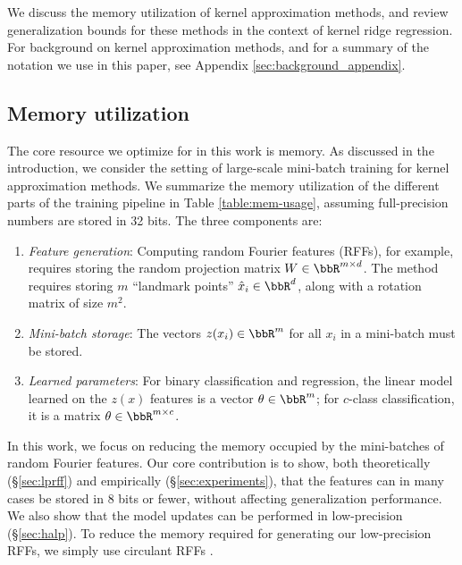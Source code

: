 We discuss the memory utilization of kernel approximation methods, and review generalization bounds for these methods in the context of kernel ridge regression. For background on kernel approximation methods, and for a summary of the notation we use in this paper, see Appendix \ref{sec:background_appendix}.
\vsp
\subsection{Memory utilization}
\label{subsec:memory_utils}
The core resource we optimize for in this work is memory.  As discussed in the introduction, we consider the setting of large-scale mini-batch training for kernel approximation methods. We summarize the memory utilization of the different parts of the training pipeline in Table \ref{table:mem-usage}, assuming full-precision numbers are stored in 32 bits. The three components are:
\begin{enumerate}
	\item \textit{Feature generation}: Computing random Fourier features (RFFs), for example, requires storing the random projection matrix $W \in \RR^{m\times d}$. The \Nystrom method requires storing $m$ ``landmark points'' $\hx_i \in \RR^d$, along with a rotation matrix of size $m^2$.
	\item \textit{Mini-batch storage}: The vectors $z(x_i)\in\RR^m$ for all $x_i$ in a mini-batch must be stored.
	\item \textit{Learned parameters}: For binary classification and regression, the linear model learned on the $z(x)$ features is a vector $\theta \in \RR^m$; for $c$-class classification, it is a matrix $\theta \in \RR^{m\times c}$.	
\end{enumerate}

In this work, we focus on reducing the memory occupied by the mini-batches of random Fourier features. Our core contribution is to show, both theoretically (\S\ref{sec:lprff}) and empirically (\S\ref{sec:experiments}), that the features can in many cases be stored in 8 bits or fewer, without affecting generalization performance. We also show that the model updates can be performed in low-precision  (\S\ref{sec:halp}). To reduce the memory required for generating our low-precision RFFs, we simply use circulant RFFs \cite{yu15}.


